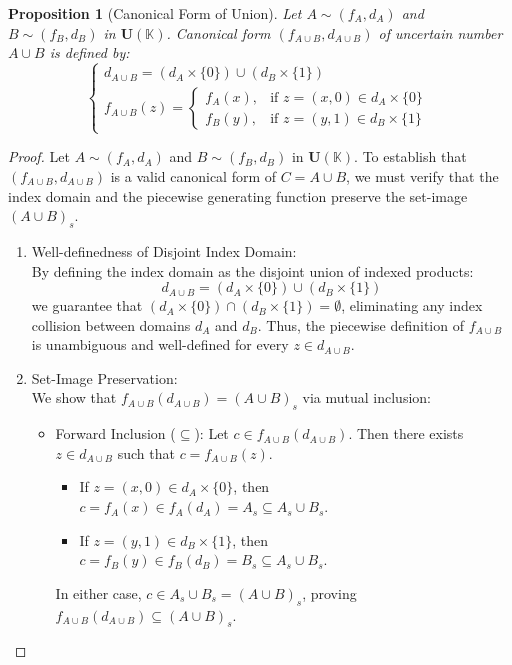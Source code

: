 \documentclass[a4paper,12pt,twoside]{memoir}
\newtheorem{proposition}{Proposition}[chapter]
\begin{document}
	\begin{proposition}[Canonical Form of Union]
		Let $A \sim (f_A, d_A)$ and $B \sim (f_B, d_B)$ in $\mathbf{U}(\mathbb{K})$. Canonical form $(f_{A \cup B}, d_{A \cup B})$ of uncertain number $A \cup B$ is defined by:
		\[
		\begin{cases}
			d_{A \cup B} = (d_A \times \{0\}) \cup (d_B \times \{1\}) \\[1ex]
			f_{A \cup B}(z) = \begin{cases}
				f_A(x), & \text{if } z = (x, 0) \in d_A \times \{0\}  \\[1ex]
				f_B(y), & \text{if } z = (y, 1) \in d_B \times \{1\}
			\end{cases}
		\end{cases}
		\]
	\end{proposition}
	\begin{proof}
		Let $A \sim (f_A, d_A)$ and $B \sim (f_B, d_B)$ in $\mathbf{U}(\mathbb{K})$. To establish that $(f_{A \cup B}, d_{A \cup B})$ is a valid canonical form of $C = A \cup B$, we must verify that the index domain and the piecewise generating function preserve the set-image $(A \cup B)_s$.
		
		\begin{enumerate}[leftmargin=*]
			\item Well-definedness of Disjoint Index Domain: \\
			By defining the index domain as the disjoint union of indexed products:
			\[
			d_{A \cup B} = (d_A \times \{0\}) \cup (d_B \times \{1\})
			\]
			we guarantee that $(d_A \times \{0\}) \cap (d_B \times \{1\}) = \emptyset$, eliminating any index collision between domains $d_A$ and $d_B$. Thus, the piecewise definition of $f_{A \cup B}$ is unambiguous and well-defined for every $z \in d_{A \cup B}$.
			
			\item Set-Image Preservation: \\
			We show that $f_{A \cup B}(d_{A \cup B}) = (A \cup B)_s$ via mutual inclusion:
			\begin{itemize}[leftmargin=*]
				\item Forward Inclusion ($\subseteq$):
				Let $c \in f_{A \cup B}(d_{A \cup B})$. Then there exists $z \in d_{A \cup B}$ such that $c = f_{A \cup B}(z)$.
				\begin{itemize}
					\item If $z = (x, 0) \in d_A \times \{0\}$, then $c = f_A(x) \in f_A(d_A) = A_s \subseteq A_s \cup B_s$.
					\item If $z = (y, 1) \in d_B \times \{1\}$, then $c = f_B(y) \in f_B(d_B) = B_s \subseteq A_s \cup B_s$.
				\end{itemize}
				In either case, $c \in A_s \cup B_s = (A \cup B)_s$, proving $f_{A \cup B}(d_{A \cup B}) \subseteq (A \cup B)_s$.
				

\end{itemize}
\end{enumerate}
\end{proof}
\end{document}
